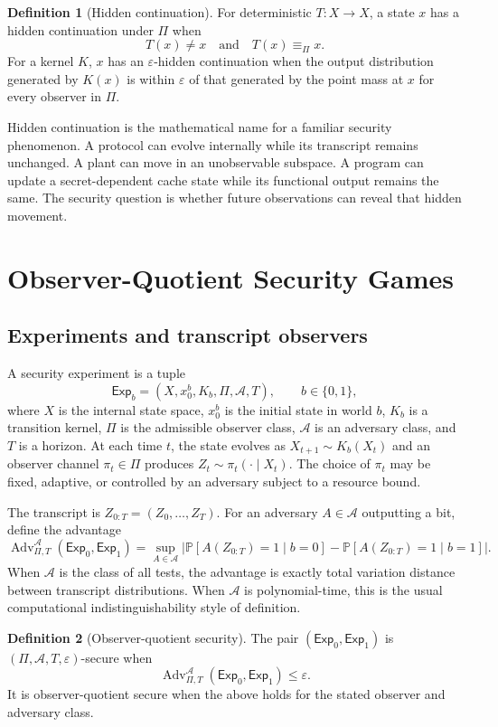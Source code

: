 \documentclass[11pt]{article}
\theoremstyle{definition}
\newtheorem{definition}{Definition}[section]
\theoremstyle{plain}
\theoremstyle{remark}
\newcommand{\Prb}{\mathbb{P}}
\newcommand{\cA}{\mathcal{A}}
\newcommand{\eps}{\varepsilon}
\newcommand{\eqobs}{\equiv_{\Pi}}
\begin{document}
\begin{definition}[Hidden continuation]
For deterministic $T:X\to X$, a state $x$ has a hidden continuation under $\Pi$ when
\[
    T(x)\ne x \quad\text{and}\quad T(x)\eqobs x.
\]
For a kernel $K$, $x$ has an $\eps$-hidden continuation when the output distribution generated by $K(x)$ is within $\eps$ of that generated by the point mass at $x$ for every observer in $\Pi$.
\end{definition}

Hidden continuation is the mathematical name for a familiar security phenomenon. A protocol can evolve internally while its transcript remains unchanged. A plant can move in an unobservable subspace. A program can update a secret-dependent cache state while its functional output remains the same. The security question is whether future observations can reveal that hidden movement.

\section{Observer-Quotient Security Games}

\subsection{Experiments and transcript observers}

A security experiment is a tuple
\[
    \mathsf{Exp}_b=(X,x_0^b,K_b,\Pi,\cA,T),\qquad b\in\{0,1\},
\]
where $X$ is the internal state space, $x_0^b$ is the initial state in world $b$, $K_b$ is a transition kernel, $\Pi$ is the admissible observer class, $\cA$ is an adversary class, and $T$ is a horizon. At each time $t$, the state evolves as $X_{t+1}\sim K_b(X_t)$ and an observer channel $\pi_t\in\Pi$ produces $Z_t\sim \pi_t(\cdot\mid X_t)$. The choice of $\pi_t$ may be fixed, adaptive, or controlled by an adversary subject to a resource bound.

The transcript is $Z_{0:T}=(Z_0,\ldots,Z_T)$. For an adversary $A\in\cA$ outputting a bit, define the advantage
\[
\operatorname{Adv}_{\Pi,T}^{\cA}(\mathsf{Exp}_0,\mathsf{Exp}_1)
=\sup_{A\in\cA}\left|\Prb[A(Z_{0:T})=1\mid b=0]-\Prb[A(Z_{0:T})=1\mid b=1]\right|.
\]
When $\cA$ is the class of all tests, the advantage is exactly total variation distance between transcript distributions. When $\cA$ is polynomial-time, this is the usual computational indistinguishability style of definition.

\begin{definition}[Observer-quotient security]
The pair $(\mathsf{Exp}_0,\mathsf{Exp}_1)$ is $(\Pi,\cA,T,\eps)$-secure when
\[
    \operatorname{Adv}_{\Pi,T}^{\cA}(\mathsf{Exp}_0,\mathsf{Exp}_1)\le \eps.
\]
It is observer-quotient secure when the above holds for the stated observer and adversary class.
\end{definition}
\end{document}
